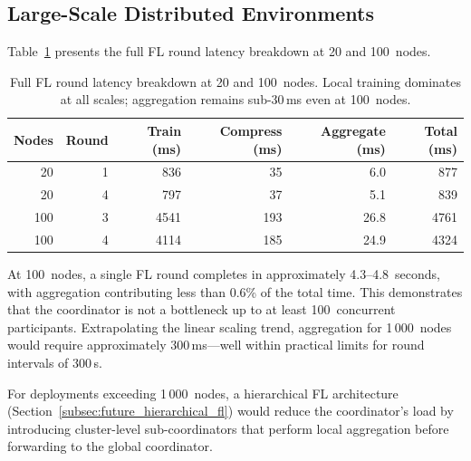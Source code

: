 \subsection{Large-Scale Distributed Environments}
\label{subsec:eval_scalability_large}

Table~\ref{tab:fl_round_scale} presents the full FL round latency breakdown
at 20 and 100~nodes.

\begin{table}[H]
    \centering
    \begin{tabular}{|r|r|r|r|r|r|}
        \hline
        \textbf{Nodes} & \textbf{Round} & \textbf{Train (ms)} &
        \textbf{Compress (ms)} & \textbf{Aggregate (ms)} &
        \textbf{Total (ms)} \\
        \hline
        20 & 1 & 836 & 35 & 6.0 & 877 \\
        20 & 4 & 797 & 37 & 5.1 & 839 \\
        \hline
        100 & 3 & 4541 & 193 & 26.8 & 4761 \\
        100 & 4 & 4114 & 185 & 24.9 & 4324 \\
        \hline
    \end{tabular}
    \caption{Full FL round latency breakdown at 20 and 100~nodes.
             Local training dominates at all scales; aggregation remains
             sub-30\,ms even at 100~nodes.}
    \label{tab:fl_round_scale}
\end{table}

At 100~nodes, a single FL round completes in approximately 4.3--4.8~seconds,
with aggregation contributing less than 0.6\% of the total time. This
demonstrates that the coordinator is not a bottleneck up to at least
100~concurrent participants. Extrapolating the linear scaling trend,
aggregation for 1\,000~nodes would require approximately 300\,ms---well within
practical limits for round intervals of 300\,s.

For deployments exceeding 1\,000~nodes, a hierarchical FL architecture
(Section~\ref{subsec:future_hierarchical_fl}) would reduce the coordinator's
load by introducing cluster-level sub-coordinators that perform local
aggregation before forwarding to the global coordinator.
